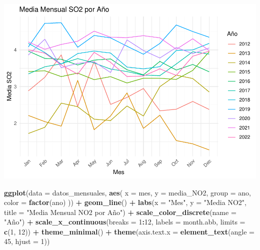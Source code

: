 \documentclass[notspecified,article,submit,moreauthors,pdftex]{Definitions/mdpi}
\newenvironment{Shaded}{\begin{snugshade}}{\end{snugshade}}
\newcommand{\AttributeTok}[1]{\textcolor[rgb]{0.13,0.29,0.53}{#1}}
\newcommand{\DecValTok}[1]{\textcolor[rgb]{0.00,0.00,0.81}{#1}}
\newcommand{\FunctionTok}[1]{\textcolor[rgb]{0.13,0.29,0.53}{\textbf{#1}}}
\newcommand{\NormalTok}[1]{#1}
\newcommand{\SpecialCharTok}[1]{\textcolor[rgb]{0.81,0.36,0.00}{\textbf{#1}}}
\newcommand{\StringTok}[1]{\textcolor[rgb]{0.31,0.60,0.02}{#1}}
\begin{document}
\includegraphics{Memoria_files/figure-latex/unnamed-chunk-27-1.pdf}

\begin{Shaded}
\begin{Highlighting}[]
\FunctionTok{ggplot}\NormalTok{(}\AttributeTok{data =}\NormalTok{ datos\_mensuales, }\FunctionTok{aes}\NormalTok{(}
  \AttributeTok{x =}\NormalTok{ mes,}
  \AttributeTok{y =}\NormalTok{ media\_NO2,}
  \AttributeTok{group =}\NormalTok{ ano,}
  \AttributeTok{color =} \FunctionTok{factor}\NormalTok{(ano)}
\NormalTok{)) }\SpecialCharTok{+}
  \FunctionTok{geom\_line}\NormalTok{() }\SpecialCharTok{+}
  \FunctionTok{labs}\NormalTok{(}\AttributeTok{x =} \StringTok{"Mes"}\NormalTok{, }\AttributeTok{y =} \StringTok{"Media NO2"}\NormalTok{, }\AttributeTok{title =} \StringTok{"Media Mensual NO2 por Año"}\NormalTok{) }\SpecialCharTok{+}
  \FunctionTok{scale\_color\_discrete}\NormalTok{(}\AttributeTok{name =} \StringTok{"Año"}\NormalTok{) }\SpecialCharTok{+}
  \FunctionTok{scale\_x\_continuous}\NormalTok{(}\AttributeTok{breaks =} \DecValTok{1}\SpecialCharTok{:}\DecValTok{12}\NormalTok{,}
                     \AttributeTok{labels =}\NormalTok{ month.abb,}
                     \AttributeTok{limits =} \FunctionTok{c}\NormalTok{(}\DecValTok{1}\NormalTok{, }\DecValTok{12}\NormalTok{)) }\SpecialCharTok{+}
  \FunctionTok{theme\_minimal}\NormalTok{() }\SpecialCharTok{+}
  \FunctionTok{theme}\NormalTok{(}\AttributeTok{axis.text.x =} \FunctionTok{element\_text}\NormalTok{(}\AttributeTok{angle =} \DecValTok{45}\NormalTok{, }\AttributeTok{hjust =} \DecValTok{1}\NormalTok{))}
\end{Highlighting}
\end{Shaded}
\end{document}
